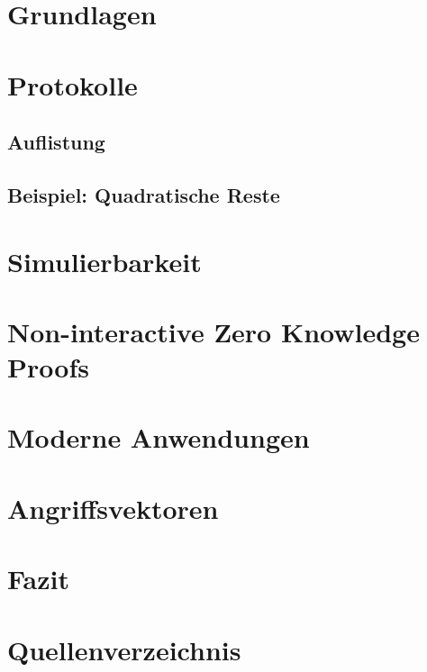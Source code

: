\documentclass {article}
\begin{document}
\section{Grundlagen}
\section{Protokolle}
\subsection{Auflistung}
\subsection{Beispiel: Quadratische Reste}
\section{Simulierbarkeit}
\section{Non-interactive Zero Knowledge Proofs}
\section{Moderne Anwendungen}
\section{Angriffsvektoren}
\section{Fazit}
\section{Quellenverzeichnis}
\end{document}
